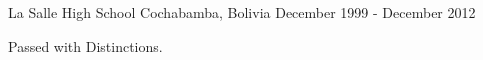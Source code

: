 \begin{cventries}
  {La Salle High School}
  {Cochabamba, Bolivia}
  {December 1999 - December 2012}
  {
    \begin{cvitems}
      \item{Passed with Distinctions.}
    \end{cvitems}
  }

\end{cventries}
